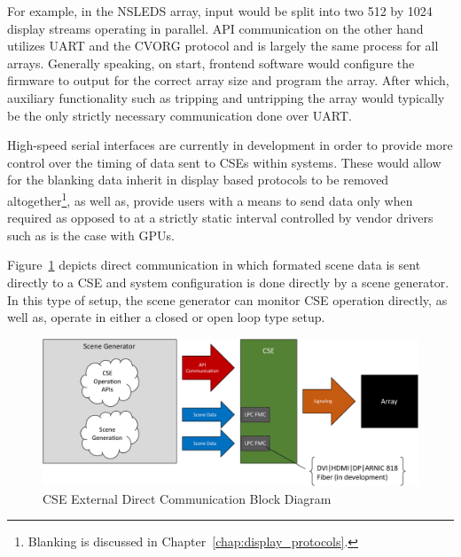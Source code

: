         For example, in the NSLEDS array, input would be split into two 512 by 1024 display streams operating in parallel. API communication on the other hand utilizes UART and the CVORG protocol and is largely the same process for all arrays. Generally speaking, on start, frontend software would configure the firmware to output for the correct array size and program the array. After which, auxiliary functionality such as tripping and untripping the array would typically be the only strictly necessary communication done over UART.

        High-speed serial interfaces are currently in development in order to provide more control over the timing of data sent to CSEs within systems. These would allow for the blanking data inherit in display based protocols to be removed altogether\footnote{Blanking is discussed in Chapter~\ref{chap:display_protocols}.}, as well as, provide users with a means to send data only when required as opposed to at a strictly static interval controlled by vendor drivers such as is the case with GPUs.

        Figure~\ref{fig:external_cse_comm_direct} depicts direct communication in which formated scene data is sent directly to a CSE and system configuration is done directly by a scene generator. In this type of setup, the scene generator can monitor CSE operation directly, as well as, operate in either a closed or open loop type setup\cite{NagrathGopal2009,Frank2018}.

        \begin{figure}
            \centering
            \includegraphics[width=1.0\textwidth]{fig/external_cse_comm_direct.pdf}
            \caption{CSE External Direct Communication Block Diagram}
            \label{fig:external_cse_comm_direct}
        \end{figure}


